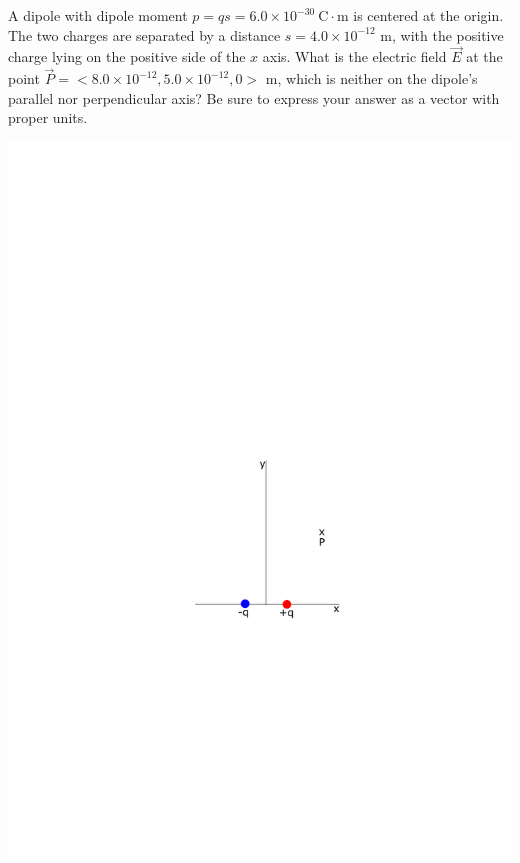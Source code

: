 \question[20] A dipole with dipole moment $p=qs=6.0\times10^{-30}\ \mathrm{C\cdot m}$ is centered at the origin. The two charges are separated by a distance $s=4.0\times10^{-12}$ m, with the positive charge lying on the positive side of the $x$ axis. What is the electric field $\vec{E}$ at the point $\vec{P}=<8.0\times 10^{-12},5.0\times10^{-12},0>$ m, which is neither on the dipole's parallel nor perpendicular axis? Be sure to express your answer as a vector with proper units.

\begin{center}
	\includegraphics[width=.6\textwidth]{dipole}
\end{center}